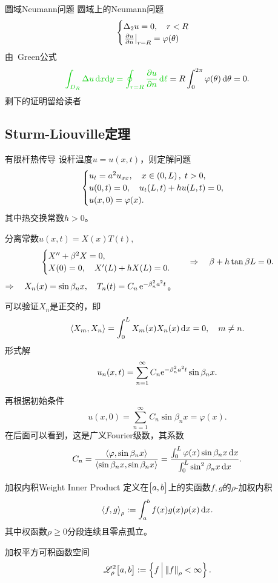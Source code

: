 \begin{example}{圆域Neumann问题}{}
	圆域上的Neumann问题
	\begin{align*}
		\begin{cases}
			\Delta_2u=0,\quad r<R\\
			\left.\frac{\partial^{\;\!\!}u}{\partial n^{\;\!\!}}\right\rvert_{r=R}=\varphi(\theta)
		\end{cases}
	\end{align*}
	由~\textcolor[rgb]{0,.8,0}{Green公式}
	\begin{align*}
		{\color[rgb]{0,.8,0}{\int_{D_R}\lap u\d x\nd y=\oint_{r=R}\pv un\d\ell}}=R\int_0^{2\pi}\varphi(\theta)\d\theta=0.
	\end{align*}
	剩下的证明留给读者
\end{example}
\clearpage
\subsection{Sturm-Liouville定理}
\begin{example}{有限杆热传导}{}
	设杆温度$u=u(x,t)$，则定解问题
	\begin{align*}
		\begin{cases}
			u_t=a^2u_{xx},\quad x\in\left(0,L\right),\;t>0,\\
			u(0,t)=0,\quad u_t(L,t)+hu(L,t)=0,\\
			u(x,0)=\varphi(x).
		\end{cases}
	\end{align*}
	其中热交换常数$h>0$。
	
	分离常数$u(x,t)=X(x)T(t),$
	\begin{align*}
		\begin{cases}
			X''+\beta^2X=0, \\
			X(0)=0,\quad X'(L)+hX(L)=0.
		\end{cases}\quad\Rightarrow\quad\beta+h\tan\beta L=0.
	\end{align*}
	$\Rightarrow\quad X_n(x)=\sin\beta_nx,\quad T_n(t)=C_n\mathop{}\!\mathrm{e}^{-\beta_n^2a^2t}$。
	
	可以验证$X_n$是正交的，即
	\[
		\left\langle X_m,X_n\right\rangle=\int_0^LX_m(x)X_n(x)\mathop{}\!\mathrm{d} x=0,\quad m\neq n.
	\]
	形式解
	\[
		u_n(x,t)=\sum_{n=1}^\infty C_n\mathrm e^{-\beta_n^2a^2t}\sin\beta_nx.
	\]
	
	再根据初始条件
	\[
		u(x,0)=\sum_{n=1}^\infty C_n\sin\beta_nx=\varphi(x).
	\]
	在后面可以看到，这是广义Fourier级数，其系数
	\[
		C_n=\frac{\left\langle \varphi,\sin\beta_nx\right\rangle}{\left\langle \sin\beta_nx,\sin\beta_nx\right\rangle}=\frac{\int_0^L\varphi(x)\sin\beta_nx\mathop{}\!\mathrm{d} x}{\int_0^L\sin^2\beta_nx\mathop{}\!\mathrm{d} x}.
	\]
\end{example}
\begin{definition}{加权内积}{Weight Inner Product}
	定义在$\bigl[a,b\bigr]$上的实函数$f,g$的$\rho$\;-\;加权内积
	\[
		\left\langle f,g\right\rangle_\rho:=\int_a^bf(x)g(x)\rho(x)\mathop{}\!\mathrm{d} x.
	\]
	其中权函数$\rho\geqslant 0$分段连续且零点孤立。

	加权平方可积函数空间
	\[
		\mathscr L_\rho^2\bigl[a,b\bigr]:=\left\{f\,\middle\vert\,\left\lVert f\right\rVert_\rho<\infty\right\}.
	\]
\end{definition}
